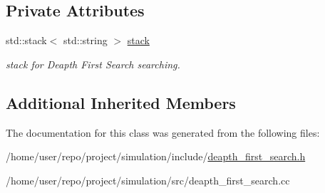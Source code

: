 \subsection*{Private Attributes}
\begin{DoxyCompactItemize}
\item 
\mbox{\label{classDeapthFirstSearch_a9aaa9441b4c7945e13dadfc5f33179b6}} 
std\+::stack$<$ std\+::string $>$ \hyperlink{classDeapthFirstSearch_a9aaa9441b4c7945e13dadfc5f33179b6}{stack}
\begin{DoxyCompactList}\small\item\em stack for Deapth First Search searching. \end{DoxyCompactList}\end{DoxyCompactItemize}
\subsection*{Additional Inherited Members}


The documentation for this class was generated from the following files\+:\begin{DoxyCompactItemize}
\item 
/home/user/repo/project/simulation/include/\hyperlink{deapth__first__search_8h}{deapth\+\_\+first\+\_\+search.\+h}\item 
/home/user/repo/project/simulation/src/deapth\+\_\+first\+\_\+search.\+cc\end{DoxyCompactItemize}
